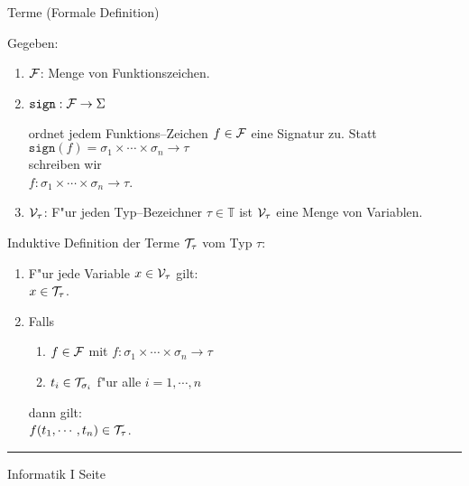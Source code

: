 \begin{slide}{}
\normalsize
\begin{center}
Terme (Formale Definition)
\end{center}
\vspace{0.5cm}

\footnotesize
Gegeben: 
\begin{enumerate}
\item ${\cal F}$: \quad Menge von Funktionszeichen.
\item $\mathtt{sign}: {\cal F} \rightarrow \Sigma$ 

      ordnet jedem Funktions--Zeichen $f \in {\cal F}$ eine Signatur zu.
      Statt \\[0.3cm]
      \hspace*{1.3cm} $\mathtt{sign}(f) = \sigma_1 \times \cdots \times \sigma_n \rightarrow \tau$ \\[0.3cm]
      schreiben wir \\[0.3cm]
      \hspace*{1.3cm} $f: \sigma_1 \times \cdots \times \sigma_n \rightarrow \tau$.
\item ${\cal V}_\tau$: \quad F"ur jeden Typ--Bezeichner $\tau \in \mathbb{T}$ ist 
      ${\cal V}_\tau$ eine Menge von Variablen.
\end{enumerate}
Induktive Definition der Terme  ${\cal T}_\tau$ vom Typ $\tau$:
\begin{enumerate}
\item F"ur jede Variable $x \in {\cal V}_\tau$ gilt:\\[0.1cm]
      \hspace*{1.3cm} $x \in {\cal T}_\tau$.
\item Falls
  \begin{enumerate}
  \item $f \in {\cal F}$ mit $f: \sigma_1 \times \cdots \times \sigma_n \rightarrow \tau$
  \item $t_i \in {\cal T}_{\sigma_i}$ f"ur alle $i = 1, \cdots, n$
  \end{enumerate}
   dann gilt: \\[0.1cm]
   \hspace*{1.3cm} $f(t_1,\cdots, t_n) \in {\cal T}_{\tau}$.
\end{enumerate}

\vspace*{\fill}
\tiny \addtocounter{mypage}{1}
\rule{15cm}{1mm}
Informatik I  \hspace*{\fill} Seite 
\end{slide}

